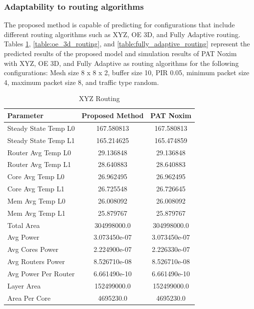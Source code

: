 \documentclass[conference]{IEEEtran}
\begin{document}
	\subsubsection{Adaptability to routing algorithms}
	The proposed method is capable of predicting for configurations that include different routing algorithms such as XYZ, OE 3D, and Fully Adaptive routing. Tables \ref{table:xyz_routing}, \ref{table:oe_3d_routing}, and \ref{table:fully_adaptive_routing} represent the predicted results of the proposed model and simulation results of PAT Noxim with XYZ, OE 3D, and Fully Adaptive as routing algorithms for the following configurations: Mesh size 8 x 8 x 2, buffer size 10, PIR 0.05, minimum packet size 4, maximum packet size 8, and traffic type random.
	
	\begin{table}[h!]
		\centering
		\begin{tabular}{|l|c|c|}
			\hline
			\textbf{Parameter} & \textbf{Proposed Method} & \textbf{PAT Noxim} \\ \hline
			Steady State Temp L0 & 167.580813 & 167.580813 \\ \hline
			Steady State Temp L1 & 165.214625 & 165.474859 \\ \hline
			Router Avg Temp L0 & 29.136848 & 29.136848 \\ \hline
			Router Avg Temp L1 & 28.640883 & 28.640883 \\ \hline
			Core Avg Temp L0 & 26.962495 & 26.962495 \\ \hline
			Core Avg Temp L1 & 26.725548 & 26.726645 \\ \hline
			Mem Avg Temp L0 & 26.008092 & 26.008092 \\ \hline
			Mem Avg Temp L1 & 25.879767 & 25.879767 \\ \hline
			Total Area & 304998000.0 & 304998000.0 \\ \hline
			Avg Power & 3.073450e-07 & 3.073450e-07 \\ \hline
			Avg Cores Power & 2.224900e-07 & 2.226330e-07 \\ \hline
			Avg Routers Power & 8.526710e-08 & 8.526710e-08 \\ \hline
			Avg Power Per Router & 6.661490e-10 & 6.661490e-10 \\ \hline
			Layer Area & 152499000.0 & 152499000.0 \\ \hline
			Area Per Core & 4695230.0 & 4695230.0 \\ \hline
		\end{tabular}
		\caption{XYZ Routing}
		\label{table:xyz_routing}
	\end{table}
	
\end{document}
